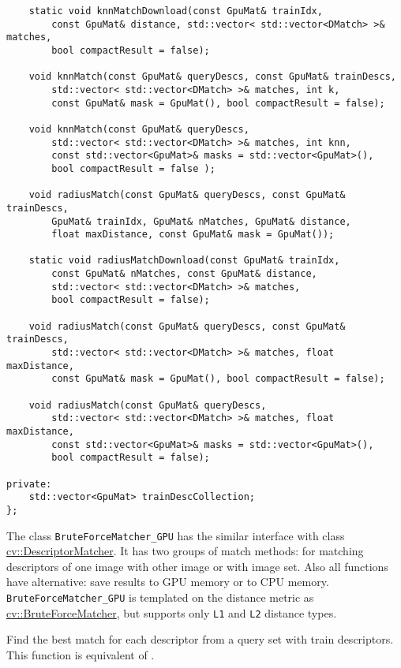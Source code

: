 \begin{lstlisting}
    static void knnMatchDownload(const GpuMat& trainIdx, 
        const GpuMat& distance, std::vector< std::vector<DMatch> >& matches, 
        bool compactResult = false);

    void knnMatch(const GpuMat& queryDescs, const GpuMat& trainDescs,
        std::vector< std::vector<DMatch> >& matches, int k, 
        const GpuMat& mask = GpuMat(), bool compactResult = false);
        
    void knnMatch(const GpuMat& queryDescs, 
        std::vector< std::vector<DMatch> >& matches, int knn,
        const std::vector<GpuMat>& masks = std::vector<GpuMat>(), 
        bool compactResult = false );

    void radiusMatch(const GpuMat& queryDescs, const GpuMat& trainDescs,
        GpuMat& trainIdx, GpuMat& nMatches, GpuMat& distance, 
        float maxDistance, const GpuMat& mask = GpuMat());

    static void radiusMatchDownload(const GpuMat& trainIdx, 
        const GpuMat& nMatches, const GpuMat& distance, 
        std::vector< std::vector<DMatch> >& matches, 
        bool compactResult = false);

    void radiusMatch(const GpuMat& queryDescs, const GpuMat& trainDescs,
        std::vector< std::vector<DMatch> >& matches, float maxDistance,
        const GpuMat& mask = GpuMat(), bool compactResult = false);

    void radiusMatch(const GpuMat& queryDescs, 
        std::vector< std::vector<DMatch> >& matches, float maxDistance,
        const std::vector<GpuMat>& masks = std::vector<GpuMat>(), 
        bool compactResult = false);

private:
    std::vector<GpuMat> trainDescCollection;
};
\end{lstlisting}

The class \texttt{BruteForceMatcher\_GPU} has the similar interface with class \hyperref[cv.class.DescriptorMatcher]{cv::DescriptorMatcher}. It has two groups of match methods: for matching descriptors of one image with other image or with image set. Also all functions have alternative: save results to GPU memory or to CPU memory. \texttt{BruteForceMatcher\_GPU} is templated on the distance metric as \hyperref[cv.class.BruteForceMatcher]{cv::BruteForceMatcher}, but supports only \texttt{L1} and \texttt{L2} distance types.

\label{cppfunc.gpu.BruteForceMatcher.match}
Find the best match for each descriptor from a query set with train descriptors. This function is equivalent of .


